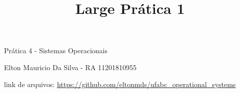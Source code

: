 




\frenchspacing 

\textual

	

	\title{Large Prática 1}	
		Prática 4 - Sistemas Operacionais	
		
		Elton Mauricio Da Silva - RA 11201810955

		link de arquivos: \url{https://github.com/eltonmds/ufabc_operational_systems}
	
	
	



\printindex


